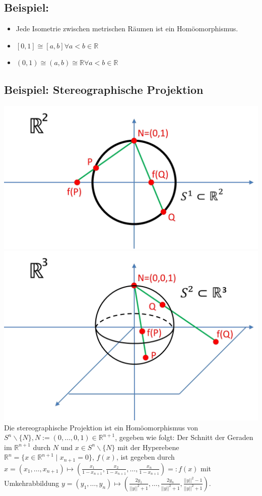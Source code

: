 \documentclass[a4paper,11pt,notitlepage]{report}
\theoremstyle{definition}
\newcommand{\R}{{\ensuremath{\mathbb{R}}}}
\newenvironment{bsp}[1]
{
\setlength{\fboxsep}{10pt}
\subsection*{Beispiel: #1}
\begin{upshape}
}
{
\end{upshape}
}
\begin{document}
\begin{bsp}{}
	\begin{itemize}
		\item Jede Isometrie zwischen metrischen Räumen ist ein Homöomorphismus.
		\item $[0,1] \cong [a,b] \forall a < b \in \R$
		\item $(0,1) \cong (a,b) \cong \R \forall a < b \in \R$
	\end{itemize}
\end{bsp}

\begin{bsp}{Stereographische Projektion}
	\includegraphics[scale=0.35]{images/Stereographie_S1_R1.png}
	\includegraphics[scale=0.35]{images/Stereographie_S2_R2.png}
	\newline
	Die stereographische Projektion ist ein Homöomorphismus von $S^n \backslash \{N\}, N := (0, \ldots, 0, 1) \in \R^{n+1}$, gegeben wie folgt:
	\newline
	Der Schnitt der Geraden im $\R^{n+1}$ durch $N$ und $x \in S^n \backslash \{N\}$ mit der Hyperebene $\R^n=\{x \in \R^{n+1} \mid x_{n+1} = 0 \}$, $f(x)$, ist gegeben durch $x = (x_1, \ldots, x_{n+1}) \mapsto (\frac{x_1}{1-x_{n+1}}, \frac{x_2}{1-x_{n+1}}, \ldots, \frac{x_n}{1-x_{n+1}}) =: f(x)$ mit Umkehrabbildung $y = (y_1, \ldots, y_n) \mapsto (\frac{2 y_1}{||y||^2+1}, \ldots, \frac{2 y_n}{||y||^2+1},\frac{||y||^2-1}{||y||^2+1})$.
\end{bsp}
\end{document}
